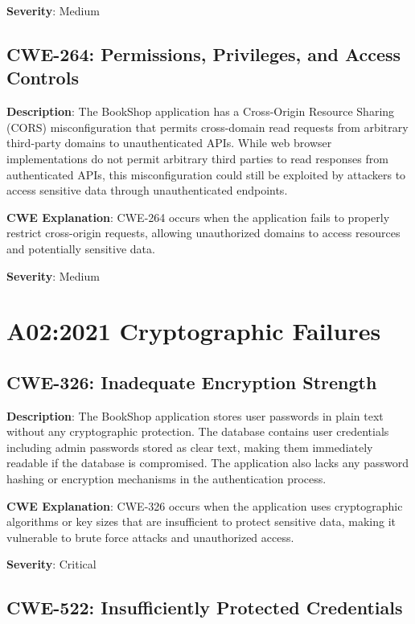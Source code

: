 \documentclass[]{UCD_CS_FYP_Report}
\begin{document}
\textbf{Severity}: Medium

\section{CWE-264: Permissions, Privileges, and Access Controls}

\textbf{Description}: The BookShop application has a Cross-Origin Resource Sharing (CORS) misconfiguration that permits cross-domain read requests from arbitrary third-party domains to unauthenticated APIs. While web browser implementations do not permit arbitrary third parties to read responses from authenticated APIs, this misconfiguration could still be exploited by attackers to access sensitive data through unauthenticated endpoints.

\textbf{CWE Explanation}: CWE-264 occurs when the application fails to properly restrict cross-origin requests, allowing unauthorized domains to access resources and potentially sensitive data.

\textbf{Severity}: Medium



\chapter{A02:2021 Cryptographic Failures}

\section{CWE-326: Inadequate Encryption Strength}

\textbf{Description}: The BookShop application stores user passwords in plain text without any cryptographic protection. The database contains user credentials including admin passwords stored as clear text, making them immediately readable if the database is compromised. The application also lacks any password hashing or encryption mechanisms in the authentication process.

\textbf{CWE Explanation}: CWE-326 occurs when the application uses cryptographic algorithms or key sizes that are insufficient to protect sensitive data, making it vulnerable to brute force attacks and unauthorized access.

\textbf{Severity}: Critical



\section{CWE-522: Insufficiently Protected Credentials}
\end{document}

